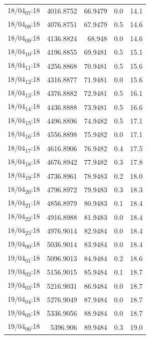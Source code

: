 \documentclass[11pt]{article}
\begin{document}
\begin{center}
\begin{tabular}{lrrrr}
18/04\textsubscript{07}:18 & 4016.8752 & 66.9479 & 0.0 & 14.1\\[0pt]
18/04\textsubscript{08}:18 & 4076.8751 & 67.9479 & 0.5 & 14.6\\[0pt]
18/04\textsubscript{09}:18 & 4136.8824 & 68.948 & 0.0 & 14.6\\[0pt]
18/04\textsubscript{10}:18 & 4196.8855 & 69.9481 & 0.5 & 15.1\\[0pt]
18/04\textsubscript{11}:18 & 4256.8868 & 70.9481 & 0.5 & 15.6\\[0pt]
18/04\textsubscript{12}:18 & 4316.8877 & 71.9481 & 0.0 & 15.6\\[0pt]
18/04\textsubscript{13}:18 & 4376.8882 & 72.9481 & 0.5 & 16.1\\[0pt]
18/04\textsubscript{14}:18 & 4436.8888 & 73.9481 & 0.5 & 16.6\\[0pt]
18/04\textsubscript{15}:18 & 4496.8896 & 74.9482 & 0.5 & 17.1\\[0pt]
18/04\textsubscript{16}:18 & 4556.8898 & 75.9482 & 0.0 & 17.1\\[0pt]
18/04\textsubscript{17}:18 & 4616.8906 & 76.9482 & 0.4 & 17.5\\[0pt]
18/04\textsubscript{18}:18 & 4676.8942 & 77.9482 & 0.3 & 17.8\\[0pt]
18/04\textsubscript{19}:18 & 4736.8961 & 78.9483 & 0.2 & 18.0\\[0pt]
18/04\textsubscript{20}:18 & 4796.8972 & 79.9483 & 0.3 & 18.3\\[0pt]
18/04\textsubscript{21}:18 & 4856.8979 & 80.9483 & 0.1 & 18.4\\[0pt]
18/04\textsubscript{22}:18 & 4916.8988 & 81.9483 & 0.0 & 18.4\\[0pt]
18/04\textsubscript{23}:18 & 4976.9014 & 82.9484 & 0.0 & 18.4\\[0pt]
19/04\textsubscript{00}:18 & 5036.9014 & 83.9484 & 0.0 & 18.4\\[0pt]
19/04\textsubscript{01}:18 & 5096.9013 & 84.9484 & 0.2 & 18.6\\[0pt]
19/04\textsubscript{02}:18 & 5156.9015 & 85.9484 & 0.1 & 18.7\\[0pt]
19/04\textsubscript{03}:18 & 5216.9031 & 86.9484 & 0.0 & 18.7\\[0pt]
19/04\textsubscript{04}:18 & 5276.9049 & 87.9484 & 0.0 & 18.7\\[0pt]
19/04\textsubscript{05}:18 & 5336.9056 & 88.9484 & 0.0 & 18.7\\[0pt]
19/04\textsubscript{06}:18 & 5396.906 & 89.9484 & 0.3 & 19.0\\[0pt]

\end{tabular}
\end{center}
\end{document}
